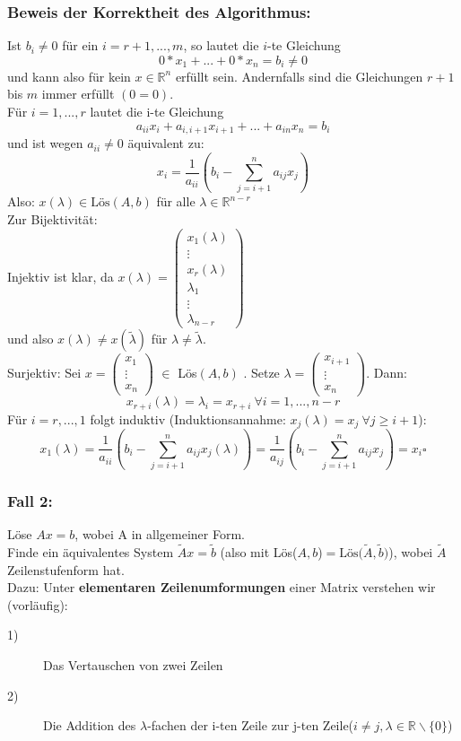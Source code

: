\documentclass{scrbook}
\begin{document}
\subsubsection*{Beweis der Korrektheit des Algorithmus:}
Ist \(b_i \neq 0\) für ein \(i=r+1,...,m\), so lautet die $i$-te Gleichung\[0*x_1+...+0*x_n = b_i \neq 0\]
und kann also für kein \(x \in \mathbb{R}^n\) erfüllt sein. Andernfalls sind die Gleichungen $r+1$ bis $m$ immer erfüllt $(0=0)$.\\
Für \(i=1,...,r\) lautet die i-te Gleichung
\[a_{ii}x_i+a_{i,i+1}x_{i+1}+...+a_{in}x_n=b_i\]
und ist wegen \(a_{ii} \neq 0\) äquivalent zu:
\[
x_i=\dfrac{1}{a_{ii}}(b_i-\sum_{j=i+1}^n a_{ij}x_j)
\]
Also: \(x(\lambda) \in  \text{Lös}(A,b)\) für alle \(\lambda \in \mathbb{R}^{n-r}\)\\
Zur Bijektivität:\\
Injektiv ist klar, da \(x(\lambda) = \left(
\begin{array}{c}
x_1(\lambda)\\
\vdots\\
x_r(\lambda)\\
\lambda_{1}\\
\vdots\\
\lambda_{n-r}
\end{array}\right) \)\\
und also \(x(\lambda) \neq x(\tilde{\lambda})\) für \(\lambda \neq \tilde{\lambda}\).\\
Surjektiv: Sei \(x=\left(\begin{array}{c}
x_1\\
\vdots\\
x_n
\end{array}\right)\) \(\in\) Lös\((A,b)\) . Setze \(\lambda=\left(\begin{array}{c}
x_{i+1}\\
\vdots\\
x_n
\end{array}\right)\).
Dann:
\[
x_{r+i}(\lambda) = \lambda_i = x_{r+i}\ \forall i=1,...,n-r
\]
Für \(i = r,...,1\) folgt induktiv (Induktionsannahme: \(x_j(\lambda)=x_j \ \forall j \geq i+1\)):
\[
x_1(\lambda)=\dfrac{1}{a_{ii}}(b_i-\sum^n_{j=i+1}a_{ij}x_j(\lambda))
=\dfrac{1}{a_{ij}}(b_i-\sum^n_{j=i+1}a_{ij}x_j)=x_i\square\]
\subsubsection*{Fall 2:}
Löse \(Ax=b\), wobei A in allgemeiner Form.\\
 Finde ein äquivalentes System \(\tilde{A}x=\tilde{b}\) (also mit Lös(\(A,b\))\(= \text{Lös(}\tilde{A},\tilde{b}\text{)}\)), wobei \(\tilde{A}\) Zeilenstufenform hat.\\
Dazu: Unter \textbf{elementaren Zeilenumformungen} einer Matrix verstehen wir (vorläufig):
\begin{description}
\item[1)] Das Vertauschen von zwei Zeilen
\item[2)] Die Addition des \(\lambda\)-fachen der i-ten Zeile zur j-ten Zeile(\(i\neq j, \lambda\in\mathbb{R}\backslash\{0\}\))
\end{description}
\end{document}
